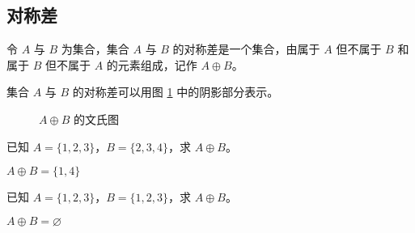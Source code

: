 \subsection{对称差}
\begin{definition}[集合的对称差]\label{def:对称差}
    令 $A$ 与 $B$ 为集合，集合 $A$ 与 $B$ 的对称差是一个集合，由属于 $A$ 但不属于 $B$ 和属于 $B$ 但不属于 $A$ 的元素组成，记作 $A \oplus B$。
\end{definition}

集合 $A$ 与 $B$ 的对称差可以用图 \ref{fig:对称差文氏图} 中的阴影部分表示。
\begin{figure}[htbp!]
    \centering
    \caption{$A \oplus B$ 的文氏图}
    \label{fig:对称差文氏图}
\end{figure}

\begin{collections}
    \begin{example}
        已知 $A=\{1, 2, 3\}$，$B = \{2, 3, 4\}$，求 $A \oplus B$。
    \end{example}
    \begin{solution}
        $A \oplus B = \{1, 4\}$
    \end{solution}

    \spare

    \begin{example}
        已知 $A=\{1, 2, 3\}$，$B=\{1, 2, 3\}$，求 $A \oplus B$。
    \end{example}
    \begin{solution}
        $A \oplus B = \varnothing$
    \end{solution}
\end{collections}

\newpage
